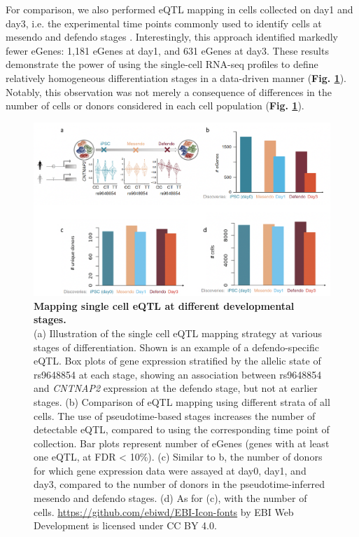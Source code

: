For comparison, we also performed eQTL mapping in cells collected on day1 and day3, i.e. the experimental time points commonly used to identify cells at mesendo and defendo stages \cite{hannan2013production}.
Interestingly, this approach identified markedly fewer eGenes: 1,181 eGenes at day1, and 631 eGenes at day3.
These results demonstrate the power of using the single-cell RNA-seq profiles to define relatively homogeneous differentiation stages in a data-driven manner (\textbf{Fig. \ref{fig:endodiff_stage_eqtl}}). 
Notably, this observation was not merely a consequence of differences in the number of cells or donors considered in each cell population (\textbf{Fig. \ref{fig:endodiff_stage_eqtl}}). \\

\begin{figure}[h]
\centering
\includegraphics[width=14cm]{Chapter4/Fig/endodiff_eqtl.png}
\caption[eQTL maps of iPSC, mesendo, defendo]{\textbf{Mapping single cell eQTL at different developmental stages.}\\
(a) Illustration of the single cell eQTL mapping strategy at various stages of differentiation.
Shown is an example of a defendo-specific eQTL. 
Box plots of gene expression stratified by the allelic state of
rs9648854 at each stage, showing an association between rs9648854 and \textit{CNTNAP2} expression at the defendo stage, but not at earlier stages. 
(b) Comparison of eQTL mapping using different strata of all cells.
The use of pseudotime-based stages increases the number of detectable eQTL, compared to using the corresponding time point of collection.
Bar plots represent number of eGenes (genes with at least one eQTL, at FDR < 10\%).
(c) Similar to b, the number of donors for which gene expression data were assayed at day0, day1, and day3, compared to the number of donors in the pseudotime-inferred mesendo and defendo stages.
(d) As for (c), with the number of cells.
\url{https://github.com/ebiwd/EBI-Icon-fonts} by EBI Web Development is licensed under CC BY 4.0. }
\label{fig:endodiff_stage_eqtl}
\end{figure}

